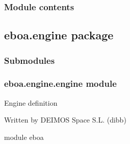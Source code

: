 \begin{fulllineitems}
\begin{fulllineitems}
\label{\detokenize{eboa.datamodel:eboa.datamodel.gauges.Gauge.name}}
\end{fulllineitems}


\begin{fulllineitems}
\label{\detokenize{eboa.datamodel:eboa.datamodel.gauges.Gauge.system}}
\end{fulllineitems}


\end{fulllineitems}



\subsubsection{Module contents}
\label{\detokenize{eboa.datamodel:module-eboa.datamodel}}\label{\detokenize{eboa.datamodel:module-contents}}

\subsection{eboa.engine package}
\label{\detokenize{eboa.engine:eboa-engine-package}}\label{\detokenize{eboa.engine::doc}}

\subsubsection{Submodules}
\label{\detokenize{eboa.engine:submodules}}

\subsubsection{eboa.engine.engine module}
\label{\detokenize{eboa.engine:module-eboa.engine.engine}}\label{\detokenize{eboa.engine:eboa-engine-engine-module}}
Engine definition

Written by DEIMOS Space S.L. (dibb)

module eboa

